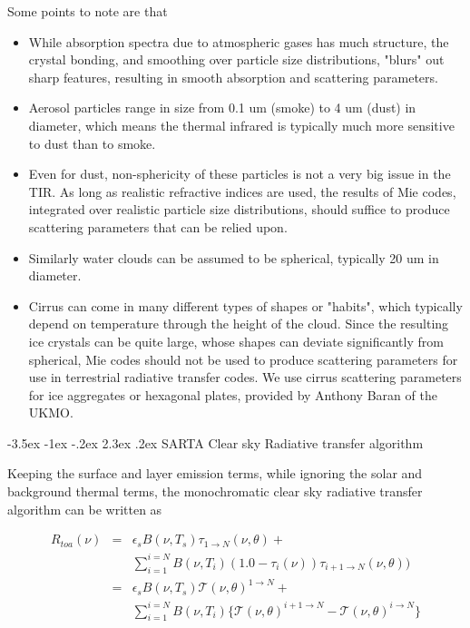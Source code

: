 \documentclass[11pt]{article}
\makeatletter
\renewcommand{\section}{\@startsection {section}{1}{\z@}%
                                   {-3.5ex \@plus -1ex \@minus -.2ex}%
                                   {2.3ex \@plus.2ex}%
                                   {\reset@font\large\bfseries}}
\makeatother
\begin{document}
Some points to note are that
\begin{itemize}
  \item While absorption spectra due to atmospheric gases has much structure, the crystal
        bonding, and smoothing over particle size distributions, "blurs" out sharp features, resulting 
        in smooth absorption and scattering parameters.
  \item Aerosol particles range in size from 0.1 um (smoke) to 4 um (dust) in diameter, which means 
        the thermal infrared is typically much more sensitive to dust than to smoke.
  \item Even for dust, non-sphericity of these particles is not a very big issue in the TIR.
        As long as realistic refractive indices are used, the results of Mie codes, integrated over 
        realistic particle size distributions, should suffice to produce scattering parameters that can be
        relied upon.
  \item Similarly water clouds can be assumed to be spherical, typically 20 um in diameter.
  \item Cirrus can come in many different types of shapes or "habits", which typically
        depend on temperature through the height of the cloud. Since the resulting ice 
        crystals can be quite large, whose shapes can deviate significantly from spherical, Mie codes should
        not be used to produce scattering parameters for use in terrestrial radiative transfer codes. 
        We use cirrus scattering parameters for ice aggregates or hexagonal plates, provided by
        Anthony Baran of the UKMO.
\end{itemize}

\section{SARTA Clear sky Radiative transfer algorithm}

Keeping the surface and layer emission terms, while ignoring the solar and background thermal terms, 
the monochromatic clear sky radiative transfer algorithm can be written as

\begin{eqnarray*}
R_{toa}(\nu) & = & \epsilon_{s} B(\nu,T_{s}) \tau_{1 \rightarrow N}(\nu,\theta) + \\
             &   &  \sum_{i=1}^{i=N} B(\nu,T_{i})
                   (1.0 - \tau_{i}(\nu)) \tau_{i+1 \rightarrow N}(\nu,\theta)) \\
             & = & \epsilon_{s} B(\nu,T_{s}) \mathcal{T}(\nu,\theta)^{1 \rightarrow N} + \\
             &   &  \sum_{i=1}^{i=N} B(\nu,T_{i}) \{ \mathcal{T}(\nu,\theta)^{i+1\rightarrow N} - 
                                                     \mathcal{T}(\nu,\theta)^{i \rightarrow N} \}
\end{eqnarray*}
\end{document}

